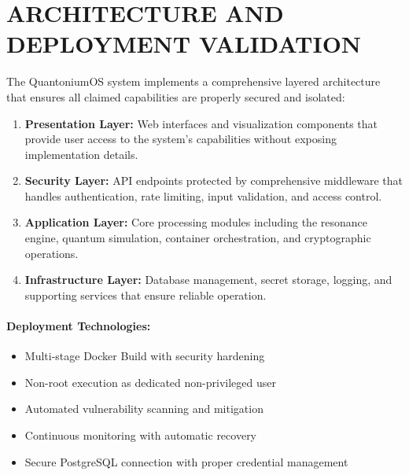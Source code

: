 \documentclass[12pt]{article}
\begin{document}
\section{ARCHITECTURE AND DEPLOYMENT VALIDATION}
\label{sec:architecture}

The QuantoniumOS system implements a comprehensive layered architecture that ensures all claimed capabilities are properly secured and isolated:

\begin{enumerate}
\item \textbf{Presentation Layer:} Web interfaces and visualization components that provide user access to the system's capabilities without exposing implementation details.

\item \textbf{Security Layer:} API endpoints protected by comprehensive middleware that handles authentication, rate limiting, input validation, and access control.

\item \textbf{Application Layer:} Core processing modules including the resonance engine, quantum simulation, container orchestration, and cryptographic operations.

\item \textbf{Infrastructure Layer:} Database management, secret storage, logging, and supporting services that ensure reliable operation.
\end{enumerate}

\paragraph{Deployment Technologies:}
\begin{itemize}
\item Multi-stage Docker Build with security hardening
\item Non-root execution as dedicated non-privileged user
\item Automated vulnerability scanning and mitigation
\item Continuous monitoring with automatic recovery
\item Secure PostgreSQL connection with proper credential management
\end{itemize}
\end{document}
